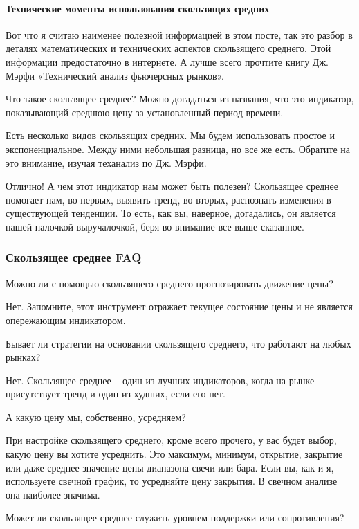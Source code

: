 \documentclass[a5paper]{article}
\begin{document}
\paragraph{Технические моменты использования скользящих средних}

Вот что я считаю наименее полезной информацией в этом посте, так это разбор в деталях математических и технических аспектов скользящего среднего. Этой информации предостаточно в интернете. А лучше всего прочтите книгу Дж. Мэрфи «Технический анализ фьючерсных рынков».

Что такое скользящее среднее? Можно догадаться из названия, что это индикатор, показывающий среднюю цену за установленный период времени.

Есть несколько видов скользящих средних. Мы будем использовать простое и экспоненциальное. Между ними небольшая разница, но все же есть. Обратите на это внимание, изучая теханализ по Дж. Мэрфи.

Отлично! А чем этот индикатор нам может быть полезен? Скользящее
среднее помогает нам, во-первых, выявить тренд, во-вторых, распознать
изменения в существующей тенденции. То есть, как вы, наверное,
догадались, он является нашей палочкой-выручалочкой, беря во внимание
все выше сказанное.

\subsubsection{Скользящее среднее FAQ}

Можно ли с помощью скользящего среднего прогнозировать движение цены?

Нет. Запомните, этот инструмент отражает текущее состояние цены и не является опережающим индикатором.

Бывает ли стратегии на основании скользящего среднего, что работают на любых рынках?

Нет. Скользящее среднее – один из лучших индикаторов, когда на рынке присутствует тренд и один из худших, если его нет.

А какую цену мы, собственно, усредняем?

При настройке скользящего среднего, кроме всего прочего, у вас будет выбор, какую цену вы хотите усреднить. Это максимум, минимум, открытие, закрытие или даже среднее значение цены диапазона свечи или бара. Если вы, как и я, используете свечной график, то усредняйте цену закрытия. В свечном анализе она наиболее значима.

Может ли скользящее среднее служить уровнем поддержки или сопротивления?
\end{document}
